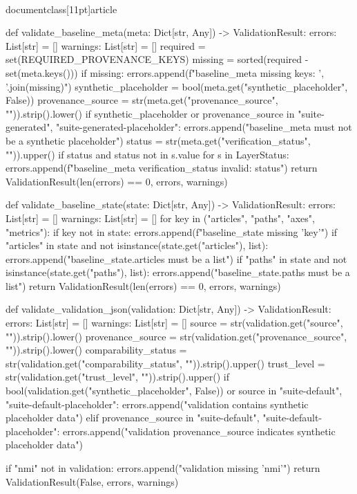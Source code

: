 \\documentclass[11pt]{article}
\begin{document}
\begin{CodeBlock}
def validate_baseline_meta(meta: Dict[str, Any]) -> ValidationResult:
    errors: List[str] = []
    warnings: List[str] = []
    required = set(REQUIRED_PROVENANCE_KEYS)
    missing = sorted(required - set(meta.keys()))
    if missing:
        errors.append(f"baseline_meta missing keys: {', '.join(missing)}")
    synthetic_placeholder = bool(meta.get("synthetic_placeholder", False))
    provenance_source = str(meta.get("provenance_source", "")).strip().lower()
    if synthetic_placeholder or provenance_source in {"suite-generated", "suite-generated-placeholder"}:
        errors.append("baseline_meta must not be a synthetic placeholder")
    status = str(meta.get("verification_status", "")).upper()
    if status and status not in {s.value for s in LayerStatus}:
        errors.append(f"baseline_meta verification_status invalid: {status}")
    return ValidationResult(len(errors) == 0, errors, warnings)


def validate_baseline_state(state: Dict[str, Any]) -> ValidationResult:
    errors: List[str] = []
    warnings: List[str] = []
    for key in ("articles", "paths", "axes", "metrics"):
        if key not in state:
            errors.append(f"baseline_state missing '{key}'")
    if "articles" in state and not isinstance(state.get("articles"), list):
        errors.append("baseline_state.articles must be a list")
    if "paths" in state and not isinstance(state.get("paths"), list):
        errors.append("baseline_state.paths must be a list")
    return ValidationResult(len(errors) == 0, errors, warnings)


def validate_validation_json(validation: Dict[str, Any]) -> ValidationResult:
    errors: List[str] = []
    warnings: List[str] = []
    source = str(validation.get("source", "")).strip().lower()
    provenance_source = str(validation.get("provenance_source", "")).strip().lower()
    comparability_status = str(validation.get("comparability_status", "")).strip().upper()
    trust_level = str(validation.get("trust_level", "")).strip().upper()
    if bool(validation.get("synthetic_placeholder", False)) or source in {"suite-default", "suite-default-placeholder"}:
        errors.append("validation contains synthetic placeholder data")
    elif provenance_source in {"suite-default", "suite-default-placeholder"}:
        errors.append("validation provenance_source indicates synthetic placeholder data")

    if "nmi" not in validation:
        errors.append("validation missing 'nmi'")
        return ValidationResult(False, errors, warnings)


\end{CodeBlock}
\end{document}
